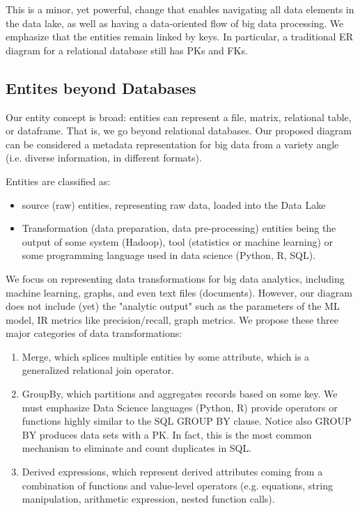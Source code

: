 \documentclass[sigconf,edbt]{acmart-edbt-workshops}
\newcommand{\+}{\discretionary{\mbox{${\bm\cdot}\mkern-1mu$}}{}{}}
\begin{document}
This is a minor, yet powerful, change that enables navigating all data elements in the data lake,
as well as having a data-oriented flow of big data processing.
We emphasize that the entities remain linked by keys.
In particular, a traditional ER diagram for a relational database still has PKs and FKs.

\subsection{Entites beyond Databases}

Our entity concept is broad:
entities can represent a file, matrix, relational table, or dataframe.
That is, we go beyond relational databases.
Our proposed diagram can be considered a metadata representation
for big data from a variety angle (i.e. diverse information, in different formats).


Entities are classified as:

\begin{itemize}
\item source (raw) entities, representing raw data,
loaded into the Data Lake

\item Transformation (data preparation, data pre-processing) entities being the output of some 
system (Hadoop), tool (statistics or machine learning) or
some programming language used in data science (Python, R, SQL).
\end{itemize}

We focus on representing data transformations for big data analytics,
including machine learning, graphs, and even text files (documents).
However, our diagram does not include (yet) the "analytic output"
such as the parameters of the ML model, IR metrics like precision/recall, graph metrics.
We propose these three major categories of data transformations: 

\begin{enumerate}
\item Merge, which splices multiple entities by some attribute, 
which is a generalized relational join operator. 

\item GroupBy, which partitions and aggregates records based on some key. 
We must emphasize Data Science languages (Python, R) 
provide operators or functions highly similar to the SQL GROUP BY  clause.
Notice also GROUP BY produces data sets with a PK.
In fact, this is the most common mechanism to eliminate and count duplicates in SQL.

\item Derived expressions, which represent derived attributes 
coming from a combination of functions and value-level operators 
(e.g. equations, string manipulation, arithmetic expression, nested function calls).
\end{enumerate}
\end{document}
